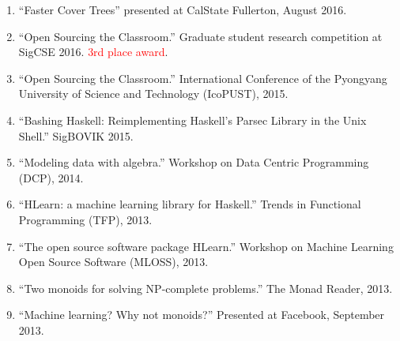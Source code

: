 \documentclass[12pt]{article}
\begin{document}
\begin{enumerate}
\item
``Faster Cover Trees'' presented at CalState Fullerton, August 2016.

\item
``Open Sourcing the Classroom.''  Graduate student research competition at SigCSE 2016.  {\textcolor{red}{3rd place award}}.

\item
``Open Sourcing the Classroom.''  International Conference of the Pyongyang University of Science and Technology (IcoPUST), 2015.

\item
``Bashing Haskell: Reimplementing Haskell's Parsec Library in the Unix Shell.''
SigBOVIK 2015.

\item
``Modeling data with algebra.'' Workshop on Data Centric Programming (DCP), 2014.

\item
``HLearn: a machine learning library for Haskell.''
Trends in Functional Programming (TFP), 2013.

\item
``The open source software package HLearn.''
Workshop on Machine Learning Open Source Software (MLOSS), 2013.

\item
``Two monoids for solving NP-complete problems.''
The Monad Reader, 2013.

\item
``Machine learning? Why not monoids?''
Presented at Facebook, September 2013.
\end{enumerate}

%
%
%
\end{document}
